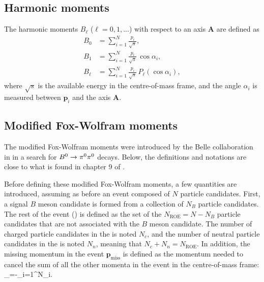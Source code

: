 \subsection{Harmonic moments} \label{sec:da_harmonic}
The harmonic moments $B_\ell$ ($\ell=0,1,...$) with respect to an axis $\mathbf{A}$ are defined as \cite{Fox:1978vu}
\begin{align}
B_0&=\sum_{i=1}^{N}\frac{p_i}{\sqrt{s}},\\
B_1&=\sum_{i=1}^{N}\frac{p_i}{\sqrt{s}}\,\cos\alpha_{i},\\
B_\ell&=\sum_{i=1}^{N}\frac{p_i}{\sqrt{s}}\,P_\ell\left(\cos\alpha_{i}\right),
\end{align}
where $\sqrt{s}$ is the available energy in the centre-of-mass frame, and the angle $\alpha_i$ is measured between $\mathbf{p}_i$ and the axis $\mathbf{A}$.
\subsection{Modified Fox-Wolfram moments} \label{sec:da_mfw}
The modified Fox-Wolfram moments were introduced by the Belle collaboration in \autocite{Lee2003} in a search for $B^0\rightarrow\pi^0\pi^0$ decays.
Below, the definitions and notations are close to what is found in chapter 9 of \autocite{BaBar:2014omp}.

Before defining these modified Fox-Wolfram moments, a few quantities are introduced, assuming as before an event composed of $N$ particle candidates.
First, a signal $B$ meson candidate is formed from a collection of $N_B$ particle candidates.
The rest of the event (\roe) is defined as the set of the $N_{\mathrm{ROE}}=N-N_B$ particle candidates that are not associated with the $B$ meson candidate.
The number of charged particle candidates in the \roe is noted $N_c$, and the number of neutral particle candidates in the \roe is noted $N_n$, meaning that $N_c+N_n=N_{\mathrm{ROE}}$.
In addition, the missing momentum in the event $\mathbf{p}_{\mathrm{miss}}$ is defined as the momentum needed to cancel the sum of all the other momenta in the event in the centre-of-mass frame:
\be \label{eq:pmiss}
_{}=-\sum_{i=1}^{N}_{i}.
\ee

